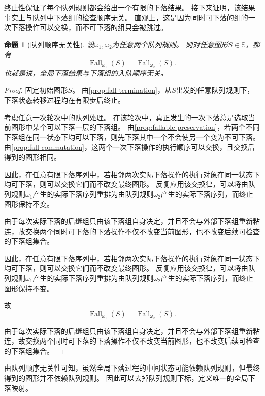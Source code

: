 \documentclass[UTF8,fontset=none]{ctexart}
\theoremstyle{cnthm}
\newtheorem{proposition}{命题}[section]
\begin{document}
			终止性保证了每个队列规则都会给出一个有限的下落结果。
			接下来证明，该结果事实上与队列中下落组的检查顺序无关。
			直观上，这是因为同时可下落的组的一次下落操作可以交换，而不可下落的组只会被跳过。
			
			\begin{proposition}[队列顺序无关性]\label{prop:queue-independence}
				设$\omega_1,\omega_2$为任意两个队列规则。
				则对任意图形$S\in\mathbb{S}$，都有
				$$
				\operatorname{Fall}_{\omega_1}(S)
				=
				\operatorname{Fall}_{\omega_2}(S).
				$$
				也就是说，全局下落结果与下落组的入队顺序无关。
			\end{proposition}
			
			\begin{proof}
				固定初始图形$S$。
				由\cref{prop:fall-termination}，从$S$出发的任意队列规则下，下落状态转移过程均在有限步后终止。
				
				考虑任意一次轮次中的队列处理。
				在该轮次中，真正发生的一次下落总是选取当前图形中某个可以下落一层的下落组。
				由\cref{prop:fallable-preservation}，若两个不同下落组在同一状态下均可以下落，则先下落其中一个不会使另一个变为不可下落。
				由\cref{prop:fall-commutation}，这两个一次下落操作的执行顺序可以交换，且交换后得到的图形相同。
				
				因此，在任意有限下落序列中，若相邻两次实际下落操作的执行对象在同一状态下均可下落，则可以交换它们而不改变最终图形。
				反复应用该交换律，可以将由队列规则$\omega_1$产生的实际下落序列重排为由队列规则$\omega_2$产生的实际下落序列，而终止图形保持不变。
				
				由于每次实际下落的后继组只由该下落组自身决定，并且不会与外部下落组重新粘连，故交换两个同时可下落的下落操作不仅不改变当前图形，也不改变后续可检查的下落组集合。
				
				因此，在任意有限下落序列中，若相邻两次实际下落操作的执行对象在同一状态下均可下落，则可以交换它们而不改变最终图形。
				反复应用该交换律，可以将由队列规则$\omega_1$产生的实际下落序列重排为由队列规则$\omega_2$产生的实际下落序列，而终止图形保持不变。
				
				故
				$$
				\operatorname{Fall}_{\omega_1}(S)
				=
				\operatorname{Fall}_{\omega_2}(S).
				$$
				
				由于每次实际下落的后继组只由该下落组自身决定，并且不会与外部下落组重新粘连，故交换两个同时可下落的下落操作不仅不改变当前图形，也不改变后续可检查的下落组集合。
			\end{proof}
			
			由队列顺序无关性可知，虽然全局下落过程的中间状态可能依赖队列规则，但最终得到的图形并不依赖队列规则。
			因此可以去掉队列规则下标，定义唯一的全局下落映射。
			
\end{document}
